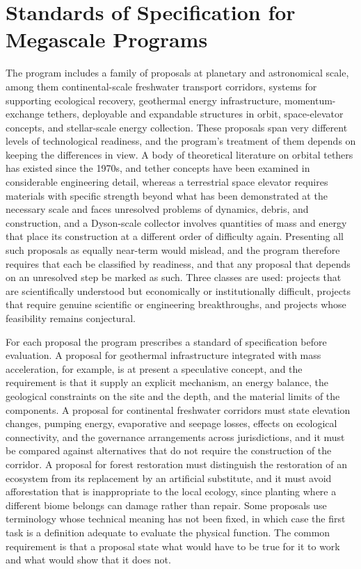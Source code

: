 \chapter{Standards of Specification for Megascale Programs}
\label{ch:16}

The program includes a family of proposals at planetary and astronomical scale, among them continental-scale freshwater transport corridors, systems for supporting ecological recovery, geothermal energy infrastructure, momentum-exchange tethers, deployable and expandable structures in orbit, space-elevator concepts, and stellar-scale energy collection. These proposals span very different levels of technological readiness, and the program's treatment of them depends on keeping the differences in view. A body of theoretical literature on orbital tethers has existed since the 1970s, and tether concepts have been examined in considerable engineering detail, whereas a terrestrial space elevator requires materials with specific strength beyond what has been demonstrated at the necessary scale and faces unresolved problems of dynamics, debris, and construction, and a Dyson-scale collector involves quantities of mass and energy that place its construction at a different order of difficulty again. Presenting all such proposals as equally near-term would mislead, and the program therefore requires that each be classified by readiness, and that any proposal that depends on an unresolved step be marked as such. Three classes are used: projects that are scientifically understood but economically or institutionally difficult, projects that require genuine scientific or engineering breakthroughs, and projects whose feasibility remains conjectural.

For each proposal the program prescribes a standard of specification before evaluation. A proposal for geothermal infrastructure integrated with mass acceleration, for example, is at present a speculative concept, and the requirement is that it supply an explicit mechanism, an energy balance, the geological constraints on the site and the depth, and the material limits of the components. A proposal for continental freshwater corridors must state elevation changes, pumping energy, evaporative and seepage losses, effects on ecological connectivity, and the governance arrangements across jurisdictions, and it must be compared against alternatives that do not require the construction of the corridor. A proposal for forest restoration must distinguish the restoration of an ecosystem from its replacement by an artificial substitute, and it must avoid afforestation that is inappropriate to the local ecology, since planting where a different biome belongs can damage rather than repair. Some proposals use terminology whose technical meaning has not been fixed, in which case the first task is a definition adequate to evaluate the physical function. The common requirement is that a proposal state what would have to be true for it to work and what would show that it does not.

